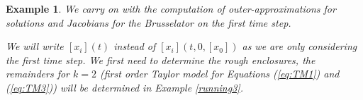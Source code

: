 \documentclass{sig-alternate-05-2015} %
\newcommand\ForAuthors[1]%
 {\par\smallskip                     %
  \begin{center}%
   \fbox%
   {\parbox{0.9\linewidth}%
    {\raggedright\sc--- #1}%
   }%
  \end{center}%
  \par\smallskip                     %
 }
\newtheorem{example}{Example}
\def\intvl#1{\mbox{$[ #1 ]$}}
\begin{document}
\begin{example}
\label{running2}
We carry on with the computation of outer-approximations for solutions and Jacobians for 
the Brusselator on the first time
step.

We will write $\intvl{x_i}(t)$ instead of $\intvl{x_i}(t,0,\intvl{x_0})$ as
we are only considering the first time step. 
We first need to determine the rough enclosures, the remainders
for $k=2$ (first order Taylor model for Equations (\ref{eq:TM1}) and (\ref{eq:TM3}))
will be determined in Example \ref{running3}. 




\end{example}
\end{document}

